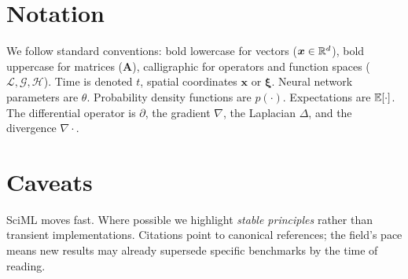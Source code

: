 \section*{Notation}
We follow standard conventions: bold lowercase for vectors
($\bm{x}\in\mathbb{R}^d$), bold uppercase for matrices ($\bm{A}$), calligraphic
for operators and function spaces ($\mathcal{L},\mathcal{G},\mathcal{H}$).
Time is denoted $t$, spatial coordinates $\bm{x}$ or $\bm{\xi}$.
Neural network parameters are $\theta$. Probability density functions
are $p(\cdot)$. Expectations are $\operatorname{\mathbb{E}}[\cdot]$. The differential
operator is $\partial$, the gradient $\nabla$, the Laplacian $\Delta$,
and the divergence $\nabla\cdot$.

\section*{Caveats}
SciML moves fast. Where possible we highlight \emph{stable principles}
rather than transient implementations. Citations point to canonical
references; the field's pace means new results may already supersede
specific benchmarks by the time of reading.
